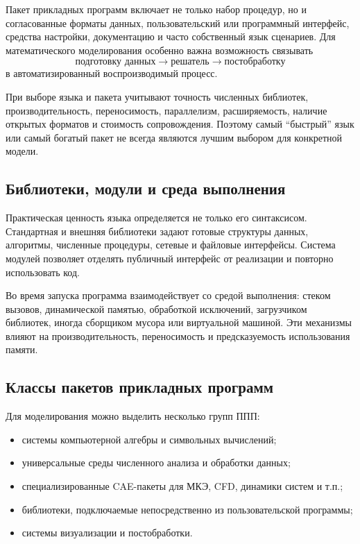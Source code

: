 Пакет прикладных программ включает не только набор процедур, но и согласованные
форматы данных, пользовательский или программный интерфейс, средства настройки,
документацию и часто собственный язык сценариев. Для математического
моделирования особенно важна возможность связывать
\[
\text{подготовку данных}\to\text{решатель}\to\text{постобработку}
\]
в автоматизированный воспроизводимый процесс.

При выборе языка и пакета учитывают точность численных библиотек,
производительность, переносимость, параллелизм, расширяемость, наличие открытых
форматов и стоимость сопровождения. Поэтому самый ``быстрый'' язык или самый
богатый пакет не всегда являются лучшим выбором для конкретной модели.



\subsection{Библиотеки, модули и среда выполнения}

Практическая ценность языка определяется не только его синтаксисом. Стандартная
и внешняя библиотеки задают готовые структуры данных, алгоритмы, численные
процедуры, сетевые и файловые интерфейсы. Система модулей позволяет отделять
публичный интерфейс от реализации и повторно использовать код.

Во время запуска программа взаимодействует со средой выполнения: стеком вызовов,
динамической памятью, обработкой исключений, загрузчиком библиотек, иногда
сборщиком мусора или виртуальной машиной. Эти механизмы влияют на
производительность, переносимость и предсказуемость использования памяти.

\subsection{Классы пакетов прикладных программ}

Для моделирования можно выделить несколько групп ППП:
\begin{itemize}
    \item системы компьютерной алгебры и символьных вычислений;
    \item универсальные среды численного анализа и обработки данных;
    \item специализированные CAE-пакеты для МКЭ, CFD, динамики систем и т.п.;
    \item библиотеки, подключаемые непосредственно из пользовательской программы;
    \item системы визуализации и постобработки.
\end{itemize}

